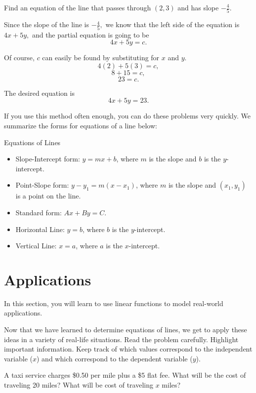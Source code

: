 \begin{example}
Find an equation of the line that passes through $(2, 3)$ and has slope $-\frac{4}{5}.$
\end{example}

\begin{solution}
Since the slope of the line is $-\frac{4}{5},$ we know that the left side of the equation is $4x + 5y,$ and the partial equation is going to be
\[4x + 5y = c.\]

Of course, $c$ can easily be found by substituting for $x$ and $y.$
\[4(2) + 5(3) = c,\]
\[8 + 15 = c,\]
\[23 = c.\]

The desired equation is
\[4x + 5y = 23.\]
\end{solution}

If you use this method often enough, you can do these problems very quickly.    
We summarize the forms for equations of a line below:
\begin{summarybox} Equations of Lines
\begin{itemize}
  \item Slope-Intercept form: $y = mx + b$, where $m$ is the slope and $b$ is the $y$-intercept.
  \item Point-Slope form: $y - y_1 = m(x - x_1)$, where $m$ is the slope and $(x_1, y_1)$ is a point on the line.
  \item Standard form: $Ax + By = C$.
  \item Horizontal Line: $y = b$, where $b$ is the $y$-intercept.
  \item Vertical Line: $x = a$, where $a$ is the $x$-intercept.
\end{itemize}
\end{summarybox}

\section{Applications}
In this section, you will learn to use linear functions to model real-world applications.

Now that we have learned to determine equations of lines, we get to apply these ideas in a variety of real-life situations.  
Read the problem carefully. Highlight important information.  Keep track of which values correspond to the independent variable ($x$) and which correspond to the dependent variable ($y$).

\begin{example}
A taxi service charges \$0.50 per mile plus a \$5 flat fee.  What will be the cost of traveling 20 miles?  What will be cost of traveling $x$ miles?
\end{example}

